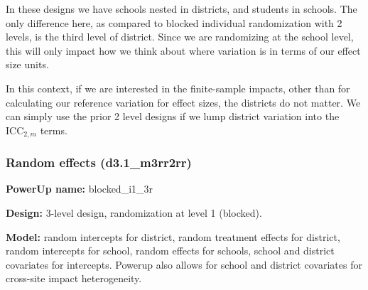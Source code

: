\documentclass[12pt]{article}
\begin{document}
In these designs we have schools nested in districts, and students in schools.
The only difference here, as compared to blocked individual randomization with 2 levels, is the third level of district.
Since we are randomizing at the school level, this will only impact how we think about where variation is in terms of our effect size units.

In this context, if we are interested in the finite-sample impacts, other than for calculating our reference variation for effect sizes, the districts do not matter.
We can simply use the prior 2 level designs if we lump district variation into the $\text{ICC}_{2,m}$ terms.



\subsubsection{Random effects (d3.1\_m3rr2rr)}

\textbf{PowerUp name:} blocked\_i1\_3r

\textbf{Design:} 3-level design, randomization at level 1 (blocked).

\textbf{Model:} random intercepts for district, random treatment effects for district, random intercepts for school, random effects for schools, school and district covariates for intercepts. Powerup also allows for school and district covariates for cross-site impact heterogeneity.
\end{document}
